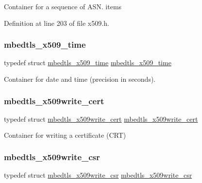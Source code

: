 Container for a sequence of A\+S\+N. items 

Definition at line 203 of file x509.\+h.

\mbox{\label{group__x509__module_ga38827540a02fb2ddca08ec0917a8a41b}} 
\subsubsection{\texorpdfstring{mbedtls\+\_\+x509\+\_\+time}{mbedtls\_x509\_time}}
{\footnotesize\ttfamily typedef struct \mbox{\hyperlink{structmbedtls__x509__time}{mbedtls\+\_\+x509\+\_\+time}}
 \mbox{\hyperlink{structmbedtls__x509__time}{mbedtls\+\_\+x509\+\_\+time}}}

Container for date and time (precision in seconds). \mbox{\label{group__x509__module_gacc3115587f8d882a7a137c38d6939e07}} 
\subsubsection{\texorpdfstring{mbedtls\+\_\+x509write\+\_\+cert}{mbedtls\_x509write\_cert}}
{\footnotesize\ttfamily typedef struct \mbox{\hyperlink{structmbedtls__x509write__cert}{mbedtls\+\_\+x509write\+\_\+cert}}
 \mbox{\hyperlink{structmbedtls__x509write__cert}{mbedtls\+\_\+x509write\+\_\+cert}}}

Container for writing a certificate (C\+RT) \mbox{\label{group__x509__module_ga7b0b4f8c5cfd541ee20c53907edb636d}} 
\subsubsection{\texorpdfstring{mbedtls\+\_\+x509write\+\_\+csr}{mbedtls\_x509write\_csr}}
{\footnotesize\ttfamily typedef struct \mbox{\hyperlink{structmbedtls__x509write__csr}{mbedtls\+\_\+x509write\+\_\+csr}}
 \mbox{\hyperlink{structmbedtls__x509write__csr}{mbedtls\+\_\+x509write\+\_\+csr}}}

